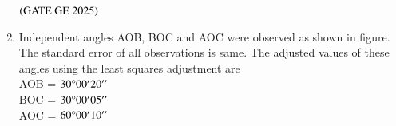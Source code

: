 \documentclass[journal,12pt,onecolumn]{IEEEtran}
\theoremstyle{remark}
\begin{document}
\begin{enumerate}
\begin{enumerate}
\end{enumerate}
\hfill $\left(\text{GATE GE 2025}\right)$
\bigskip
\item Independent angles AOB, BOC and AOC were observed as shown in figure.
The standard error of all observations is same. The adjusted values of these angles using the least squares adjustment are\\
AOB = $30\degree00'20''$\\
BOC = $30\degree00'05''$\\
AOC = $60\degree00'10''$\\


\end{enumerate}
\end{document}
